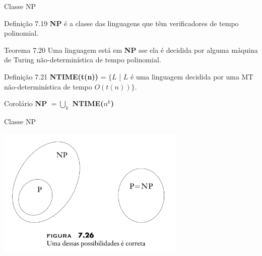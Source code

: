 \documentclass[xcolor=dvipsnames,table]{beamer}
\begin{document}
	\begin{frame}[shrink]{Classe NP}
		\begin{block}{Definição 7.19}
			{\bf NP} é a classe das linguagens que têm verificadores de tempo polinomial.
		\end{block} \pause
		\begin{block}{Teorema 7.20}
			Uma linguagem está em {\bf NP} sse ela é decidida por alguma máquina de Turing não-determinística de tempo polinomial.
		\end{block} \pause
		\begin{block}{Definição 7.21}
			{\bf NTIME(t(n))} = $\{L$ | $L$ é uma linguagem decidida por uma MT não-determinística de tempo $O(t(n)) \}$.
		\end{block} \pause
		\begin{exampleblock}{Corolário}
			{\bf NP} $= \bigcup_k$ {\bf NTIME($n^k$)}
		\end{exampleblock}
	\end{frame}
	
	\begin{frame}{Classe NP}
		\begin{center}
			\includegraphics[width=9cm]{images/pNp.png}
		\end{center}
	\end{frame}
	
	\begin{frame}
		\titlepage
	\end{frame}
	
\end{document}
